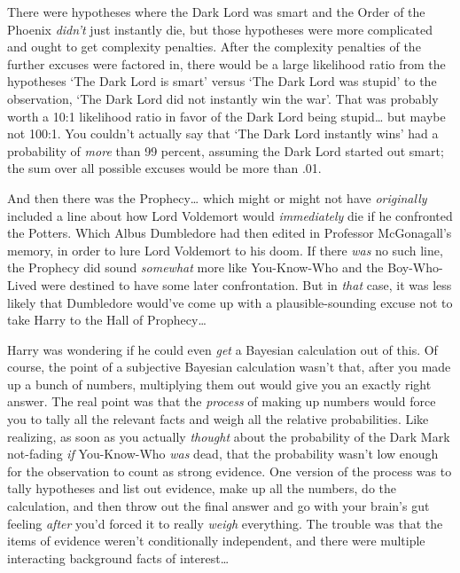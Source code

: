 There were hypotheses where the Dark Lord was smart and the Order of the 
Phoenix \emph{didn't} just instantly die, but those hypotheses were more 
complicated and ought to get complexity penalties. After the complexity 
penalties of the further excuses were factored in, there would be a large 
likelihood ratio from the hypotheses `The Dark Lord is smart' versus `The Dark 
Lord was stupid' to the observation, `The Dark Lord did not instantly win the 
war'. That was probably worth a 10:1 likelihood ratio in favor of the Dark Lord 
being stupid{\ldots} but maybe not 100:1. You couldn't actually say that `The 
Dark Lord instantly wins' had a probability of \emph{more} than 99 percent, 
assuming the Dark Lord started out smart; the sum over all possible excuses 
would be more than .01.

And then there was the Prophecy{\ldots} which might or might not have 
\emph{originally} included a line about how Lord Voldemort would 
\emph{immediately} die if he confronted the Potters. Which Albus Dumbledore had 
then edited in Professor McGonagall's memory, in order to lure Lord Voldemort 
to his doom. If there \emph{was} no such line, the Prophecy did sound 
\emph{somewhat} more like You-Know-Who and the Boy-Who-Lived were destined to 
have some later confrontation. But in \emph{that} case, it was less likely that 
Dumbledore would've come up with a plausible-sounding excuse not to take Harry 
to the Hall of Prophecy{\ldots}

Harry was wondering if he could even \emph{get} a Bayesian calculation out of 
this. Of course, the point of a subjective Bayesian calculation wasn't that, 
after you made up a bunch of numbers, multiplying them out would give you an 
exactly right answer. The real point was that the \emph{process} of making up 
numbers would force you to tally all the relevant facts and weigh all the 
relative probabilities. Like realizing, as soon as you actually \emph{thought} 
about the probability of the Dark Mark not-fading \emph{if} You-Know-Who 
\emph{was} dead, that the probability wasn't low enough for the observation to 
count as strong evidence. One version of the process was to tally hypotheses 
and list out evidence, make up all the numbers, do the calculation, and then 
throw out the final answer and go with your brain's gut feeling \emph{after} 
you'd forced it to really \emph{weigh} everything. The trouble was that the 
items of evidence weren't conditionally independent, and there were multiple 
interacting background facts of interest{\ldots}

